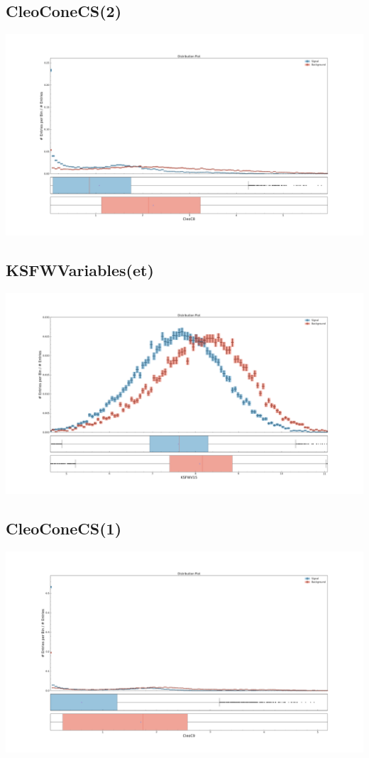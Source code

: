 \documentclass[10pt,a4paper]{article}
\begin{document}
\subsection{CleoConeCS(2)}
\begin{center}
\includegraphics[width=1.0\textwidth]{variable_4131128916495860298.pdf}
\end{center}
\subsection{KSFWVariables(et)}
\begin{center}
\includegraphics[width=1.0\textwidth]{variable_-4713215011754826475.pdf}
\end{center}
\subsection{CleoConeCS(1)}
\begin{center}
\includegraphics[width=1.0\textwidth]{variable_-5870307049152246511.pdf}
\end{center}
\end{document}
